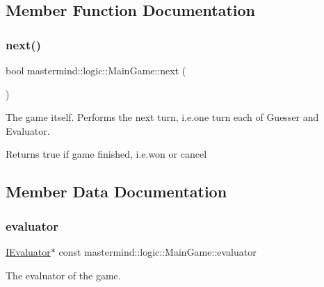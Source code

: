 \subsection{Member Function Documentation}
\hypertarget{classmastermind_1_1logic_1_1_main_game_a2b48f18cf8dbd95431d4627b57ea5d01}{}\label{classmastermind_1_1logic_1_1_main_game_a2b48f18cf8dbd95431d4627b57ea5d01} 
\subsubsection{\texorpdfstring{next()}{next()}}
{\footnotesize\ttfamily bool mastermind\+::logic\+::\+Main\+Game\+::next (\begin{DoxyParamCaption}{ }\end{DoxyParamCaption})}



The game itself. Performs the next turn, i.\+e.\+one turn each of Guesser and Evaluator. 

\begin{DoxyReturn}{Returns}
{\ttfamily true} if game finished, i.\+e.\+won or cancel 
\end{DoxyReturn}


\subsection{Member Data Documentation}
\hypertarget{classmastermind_1_1logic_1_1_main_game_a1ef0616e5078e9ac2b04cef8a83e0a8f}{}\label{classmastermind_1_1logic_1_1_main_game_a1ef0616e5078e9ac2b04cef8a83e0a8f} 
\subsubsection{\texorpdfstring{evaluator}{evaluator}}
{\footnotesize\ttfamily \hyperlink{classmastermind_1_1logic_1_1_i_evaluator}{I\+Evaluator}$\ast$ const mastermind\+::logic\+::\+Main\+Game\+::evaluator\hspace{0.3cm}{\ttfamily [private]}}



The evaluator of the game. 

\hypertarget{classmastermind_1_1logic_1_1_main_game_a063ce840892c07f33091a2e3935365ee}{}\label{classmastermind_1_1logic_1_1_main_game_a063ce840892c07f33091a2e3935365ee} 
